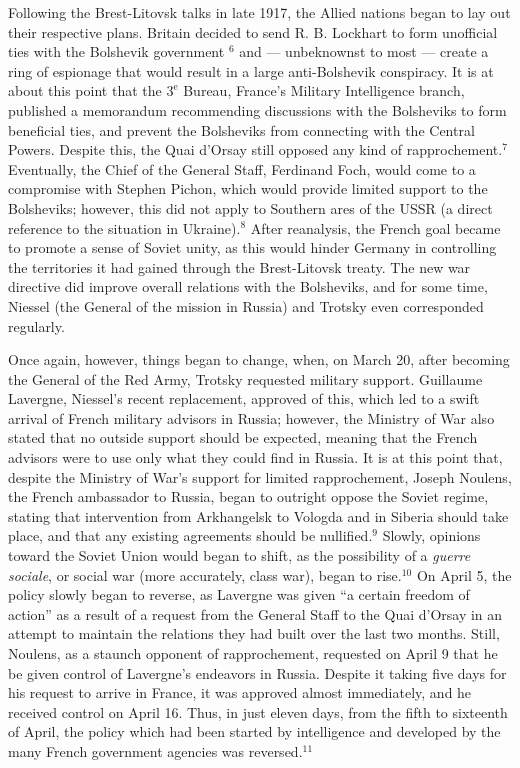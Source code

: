 \begin{justify}
  \hspace{.5 in} Following the Brest-Litovsk talks in late 1917, the Allied nations began to lay out their respective plans. Britain decided to send R. B. Lockhart to form unofficial ties with the Bolshevik government $^{6}$ and — unbeknownst to most — create a ring of espionage that would result in a large anti-Bolshevik conspiracy. It is at about this point that the $3^{\text{e}}$ Bureau, France's Military Intelligence branch, published a memorandum recommending discussions with the Bolsheviks to form beneficial ties, and prevent the Bolsheviks from connecting with the Central Powers. Despite this, the Quai d'Orsay still opposed any kind of rapprochement.$^{7}$ Eventually, the Chief of the General Staff, Ferdinand Foch, would come to a compromise with Stephen Pichon, which would provide limited support to the Bolsheviks; however, this did not apply to Southern ares of the USSR (a direct reference to the situation in Ukraine).$^{8}$ After reanalysis, the French goal became to promote a sense of Soviet unity, as this would hinder Germany in controlling the territories it had gained through the Brest-Litovsk treaty. The new war directive did improve overall relations with the Bolsheviks, and for some time, Niessel (the General of the mission in Russia) and Trotsky even corresponded regularly. 

  \hspace{.5 in} Once again, however, things began to change, when, on March 20, after becoming the General of the Red Army, Trotsky requested military support. Guillaume Lavergne, Niessel's recent replacement, approved of this, which led to a swift arrival of French military advisors in Russia; however, the Ministry of War also stated that no outside support should be expected, meaning that the French advisors were to use only what they could find in Russia. It is at this point that, despite the Ministry of War's support for limited rapprochement, Joseph Noulens, the French ambassador to Russia, began to outright oppose the Soviet regime, stating that intervention from Arkhangelsk to Vologda and in Siberia should take place, and that any existing agreements should be nullified.$^{9}$ Slowly, opinions toward the Soviet Union would began to shift, as the possibility of a \textit{guerre sociale}, or social war (more accurately, class war), began to rise.$^{10}$ On April 5, the policy slowly began to reverse, as Lavergne was given ``a certain freedom of action'' as a result of a request from the General Staff to the Quai d'Orsay in an attempt to maintain the relations they had built over the last two months. Still, Noulens, as a staunch opponent of rapprochement, requested on April 9 that he be given control of Lavergne's endeavors in Russia. Despite it taking five days for his request to arrive in France, it was approved almost immediately, and he received control on April 16. Thus, in just eleven days, from the fifth to sixteenth of April, the policy which had been started by intelligence and developed by the many French government agencies was reversed.$^{11}$


\end{justify}
